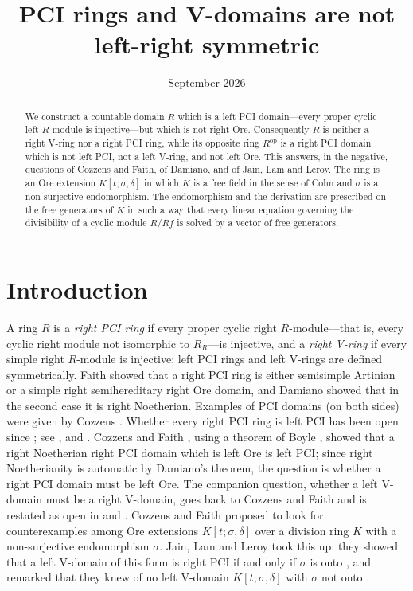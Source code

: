 \documentclass[11pt]{amsart}
\title{PCI rings and V-domains are not left-right symmetric}
\date{September 2026}
\theoremstyle{plain}
\theoremstyle{definition}
\theoremstyle{remark}
\newcommand{\op}{\mathrm{op}}
\begin{document}
\begin{abstract}
We construct a countable domain $R$ which is a left PCI domain---every proper cyclic left $R$-module is injective---but which is not right Ore. Consequently $R$ is neither a right V-ring nor a right PCI ring, while its opposite ring $R^{\op}$ is a right PCI domain which is not left PCI, not a left V-ring, and not left Ore. This answers, in the negative, questions of Cozzens and Faith, of Damiano, and of Jain, Lam and Leroy. The ring is an Ore extension $K[t;\sigma,\delta]$ in which $K$ is a free field in the sense of Cohn and $\sigma$ is a non-surjective endomorphism. The endomorphism and the derivation are prescribed on the free generators of $K$ in such a way that every linear equation governing the divisibility of a cyclic module $R/Rf$ is solved by a vector of free generators.
\end{abstract}

\maketitle

\section{Introduction}

A ring $R$ is a \emph{right PCI ring} if every proper cyclic right $R$-module---that is, every cyclic right module not isomorphic to $R_R$---is injective, and a \emph{right V-ring} if every simple right $R$-module is injective; left PCI rings and left V-rings are defined symmetrically. Faith \cite{Fai73} showed that a right PCI ring is either semisimple Artinian or a simple right semihereditary right Ore domain, and Damiano \cite[Theorem~1]{Dam79} showed that in the second case it is right Noetherian. Examples of PCI domains (on both sides) were given by Cozzens \cite{Coz70}. Whether every right PCI ring is left PCI has been open since \cite{Fai73}; see \cite[\S2]{BG75}, \cite[\S7]{CF75} and \cite[\S2]{JS09}. Cozzens and Faith \cite[6.25, 6.26]{CF75}, using a theorem of Boyle \cite{Boy74}, showed that a right Noetherian right PCI domain which is left Ore is left PCI; since right Noetherianity is automatic by Damiano's theorem, the question is whether a right PCI domain must be left Ore. The companion question, whether a left V-domain must be a right V-domain, goes back to Cozzens and Faith \cite[\S7, (10)]{CF75} and is restated as open in \cite[\S1]{JLL09} and \cite[Remark~2.8]{BDV18}. Cozzens and Faith \cite[\S7, (7), (10)]{CF75} proposed to look for counterexamples among Ore extensions $K[t;\sigma,\delta]$ over a division ring $K$ with a non-surjective endomorphism $\sigma$. Jain, Lam and Leroy \cite[\S6]{JLL09} took this up: they showed that a left V-domain of this form is right PCI if and only if $\sigma$ is onto \cite[Theorem~6.2]{JLL09}, and remarked that they knew of no left V-domain $K[t;\sigma,\delta]$ with $\sigma$ not onto \cite[Remark~6.3]{JLL09}.
\end{document}
